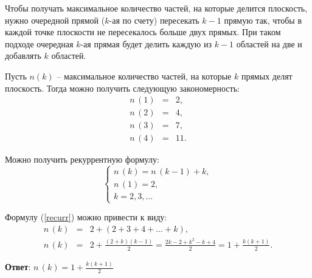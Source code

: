\documentclass{article}
\begin{document}
\begin{enumerate}
        Чтобы получать максимальное количество частей, на которые делится плоскость, нужно очередной прямой ($k$-ая по счету) пересекать $k-1$ прямую так, чтобы в каждой точке плоскости не пересекалось больше двух прямых. При таком подходе очередная $k$-ая прямая будет делить каждую из $k-1$ областей на две  и добавлять $k$ областей.

        Пусть $n(k)$ -- максимальное количество частей, на которые $k$ прямых делят плоскость. Тогда можно получить следующую закономерность:
        \begin{eqnarray}
            n\,(1) &=& 2, \\
            n\,(2) &=& 4, \\
            n\,(3) &=& 7, \\
            n\,(4) &=& 11.
        \end{eqnarray}

        Можно получить рекуррентную формулу:
        \begin{equation}\label{recurr}
            \begin{cases}
                n\,(k) = n\,(k-1)+k, \\
                n\,(1) = 2, \\
                k = 2, 3, \ldots
            \end{cases}
        \end{equation}

        Формулу (\ref{recurr}) можно привести к виду:
        \begin{eqnarray}
            n\,(k) &=& 2 + (2 + 3 + 4 + \ldots + k), \\
            n\,(k) &=& 2 + \frac{(2 + k)(k - 1)}{2} = \frac{2k-2+k^2-k+4}{2}=1+\frac{k(k+1)}{2}.
        \end{eqnarray}

        \textbf{Ответ}:
        $n\,(k) = 1 + \frac{k(k+1)}{2}$

    \end{enumerate}
\end{document}
